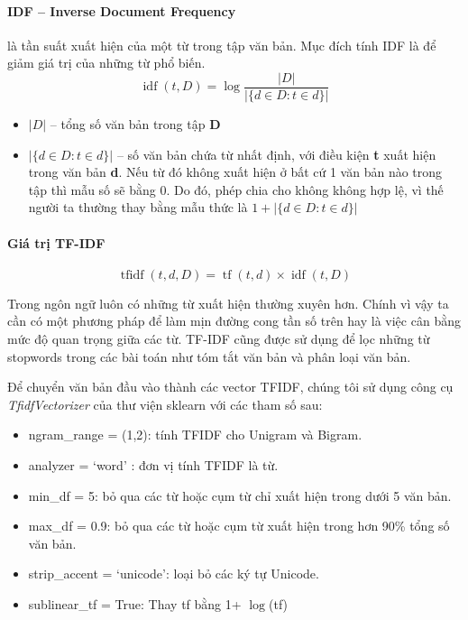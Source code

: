 \documentclass[12pt,a4paper,oneside]{book}
\begin{document}
	 		\paragraph{IDF – Inverse Document Frequency} là tần suất xuất hiện của một từ trong tập văn bản. Mục đích tính IDF là để giảm giá trị của những từ phổ biến. 
	 		\begin{equation}
	 			\operatorname{idf}(t,D) = \log\frac{\lvert D \rvert}{\lvert \{ d \in D : t \in d \} \rvert}
	 		\end{equation}
	 		\begin{itemize}
	 			\item $\lvert D \rvert$ – tổng số văn bản trong tập \textbf{D}
	 			\item $\lvert \{ d \in D : t \in d \} \rvert$ – số văn bản chứa từ nhất định, với điều kiện \textbf{t} xuất hiện trong văn bản \textbf{d}. Nếu từ đó không xuất hiện ở bất cứ 1 văn bản nào trong tập thì mẫu số sẽ bằng 0. Do đó, phép chia cho không không hợp lệ, vì thế người ta thường thay bằng mẫu thức là $1 + \lvert \{ d \in D : t \in d \} \rvert$
	 		\end{itemize}
	
	 		\paragraph{Giá trị TF-IDF}
			\begin{equation}
			\operatorname{tfidf}(t,d,D) = \operatorname{tf}(t,d) \times \operatorname{idf}(t,D)
			\end{equation}
			
			Trong ngôn ngữ luôn có những từ xuất hiện thường xuyên hơn. Chính vì vậy  ta cần có một phương pháp để làm mịn đường cong tần số trên hay là việc cân bằng mức độ quan trọng giữa các từ. TF-IDF cũng được sử dụng để lọc những từ stopwords trong các bài toán như tóm tắt văn bản và phân loại văn bản.
			
			Để chuyển văn bản đầu vào thành các vector TFIDF, chúng tôi sử dụng công cụ \textit{TfidfVectorizer} của thư viện sklearn với các tham số sau:
			
			\begin{itemize}
			\item ngram\_range = (1,2): tính TFIDF cho Unigram và Bigram.
			\item analyzer = `word' : đơn vị tính TFIDF là từ.
			\item min\_df = 5: bỏ qua các từ hoặc cụm từ chỉ xuất hiện trong dưới 5 văn bản.
			\item max\_df = 0.9: bỏ qua các từ hoặc cụm từ xuất hiện trong hơn 90\% tổng số văn bản.
			\item strip\_accent = `unicode': loại bỏ các ký tự Unicode.
			\item sublinear\_tf = True: Thay tf bằng 1+ $\log$(tf)
			\end{itemize}
			
\end{document}

